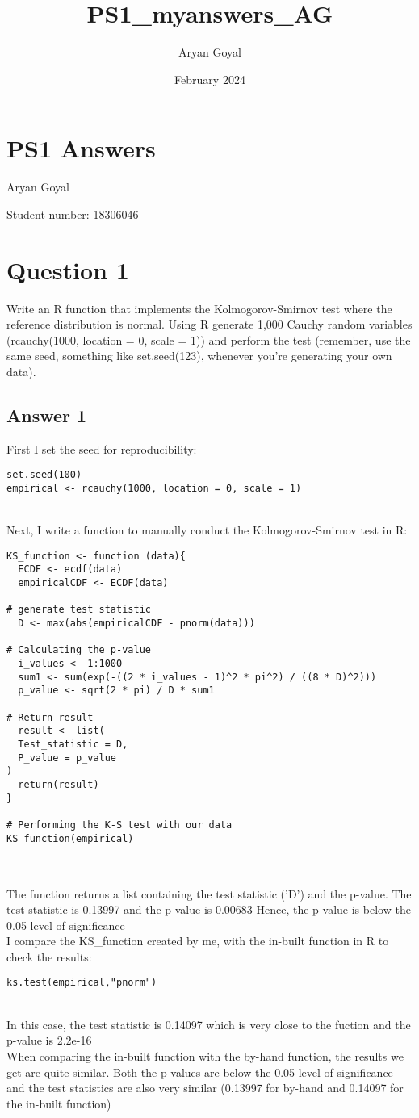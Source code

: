 \documentclass{article}
\title{PS1_myanswers_AG}
\author{Aryan Goyal}
\date{February 2024}
\begin{document}
\section{PS1 Answers}
Aryan Goyal

\noindent Student number: 18306046
\vspace{0.2cm}

\section{Question 1}
Write an R function that implements the Kolmogorov-Smirnov test where the reference distribution is normal. Using R generate 1,000 Cauchy random variables (rcauchy(1000, location = 0, scale = 1)) and perform the
test (remember, use the same seed, something like set.seed(123), whenever you’re generating your own data).

\subsection{Answer 1}
First I set the seed for reproducibility:
\begin{verbatim}
set.seed(100)
empirical <- rcauchy(1000, location = 0, scale = 1)
\end{verbatim}
\\
Next, I write a function to manually conduct the Kolmogorov-Smirnov test in R:
\begin{verbatim}    
KS_function <- function (data){
  ECDF <- ecdf(data)
  empiricalCDF <- ECDF(data)
  
# generate test statistic
  D <- max(abs(empiricalCDF - pnorm(data)))
  
# Calculating the p-value
  i_values <- 1:1000
  sum1 <- sum(exp(-((2 * i_values - 1)^2 * pi^2) / ((8 * D)^2)))
  p_value <- sqrt(2 * pi) / D * sum1
  
# Return result
  result <- list(
  Test_statistic = D,
  P_value = p_value
)
  return(result)
}

# Performing the K-S test with our data
KS_function(empirical)
    
\end{verbatim}
\\
The function returns a list containing the test statistic ('D') and the p-value. The test statistic is 0.13997 and the p-value is 0.00683
    Hence, the p-value is below the 0.05 level of significance
\\
\vspace{0.1cm}
I compare the KS\_function created by me, with the in-built function in R to check the results:
\\
\begin{verbatim}
ks.test(empirical,"pnorm")
\end{verbatim}
\\
In this case, the test statistic is 0.14097 which is very close to the fuction and the p-value is 2.2e-16 
\vspace{0.1cm}
\\
When comparing the in-built function with the by-hand function, the results we get are quite similar. Both the p-values are below the 0.05 level of significance and the test statistics are also very similar (0.13997 for by-hand and 0.14097 for the in-built function)
\end{document}
